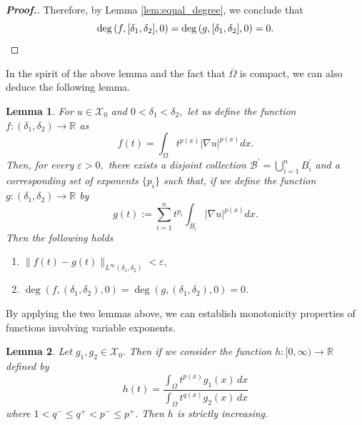 \documentclass[11pt]{article}
\newtheorem{lemma}{Lemma}[section] %
\newcommand{\X}{\mathcal{X}_{0}}
\newcommand{\om} {\Omega}
\newcommand{\lv}{\lVert}
\newcommand{\rv}{\rVert}
\newcommand{\grad}{\nabla}
\begin{document}
\begin{proof}[\bf Proof.]
 
Therefore, by Lemma \ref{lem:equal_degree}, 
we conclude that
\begin{equation*} 
\deg
\left ( f, [\delta_1, \delta_2], 0 
\right ) = \deg
\left ( g, [\delta_1, \delta_2], 0 
\right ) = 0.\qedhere
\end{equation*}
\end{proof}
In the spirit of the above lemma and the fact that
 $\overline{\om}$
is compact, we can also deduce the following lemma.


\begin{lemma}\label{lem:function_increasing_degree}
For $u \in \X$
and $0 < \delta_1 < \delta_2,$
let us define the function
$f : (\delta_1, \delta_2) \to \mathbb{R}$
as
\begin{equation*} 
f(t) = 
\int_{\om} t^{p(x)}|\grad u|^{p(x)} dx.
\end{equation*}
Then, for every $\varepsilon > 0,$
there exists a disjoint collection 
$\mathcal{B}^{\prime} = \bigcup_{i=1}^{n} B_i^{\prime}$
and a corresponding set of exponents 
$\{ p_i \}$
such that, if we define the function 
$g : (\delta_1, \delta_2) \to \mathbb{R}$
by 
\begin{equation*} 
g(t) := \sum_{i=1}^n t^{p_i} 
\int_{B_i^{\prime}} |\grad u|^{p(x)}   dx.
\end{equation*}
Then the following holds
\begin{enumerate}
    
\item $\lv f(t) - g(t) 
\rv_{L^{\infty}(\delta_1, \delta_2)}
 < \varepsilon,$

    
\item $\deg(f,(\delta_1, \delta_2), 0) 
= \deg(g,(\delta_1, \delta_2), 0) = 0 $.
\end{enumerate}
\end{lemma}

By applying the two lemmas above, 
we can establish monotonicity 
properties of functions involving 
variable exponents.


\begin{lemma}\label{lm:strictly_increas}
    Let $g_1, g_2 \in \X.$
Then if we consider the function 
$h : [0,\infty) \to \mathbb{R}$
defined by 
\begin{equation*}
    h(t) = 
\frac{ 
\int_{\Omega} t^{p(x)} g_1(x) \, dx}{ 
\int_{\Omega} t^{q(x)} g_2(x) \, dx}
\end{equation*}
where $1 < q^- \leq q^+ <p^- \leq p^+.$
Then $h$
is strictly increasing.
\end{lemma}
\end{document}
